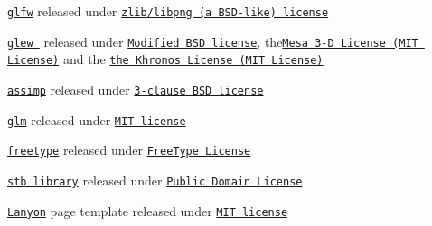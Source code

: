 \begin{DoxyItemize}
\item \href{http://www.glfw.org}{\tt glfw} released under \href{v}{\tt zlib/libpng (a B\+S\+D-\/like) license} 
\item \href{https://github.com/omniavinco/glew-cmake}{\tt glew } released under \href{http://glew.sourceforge.net/glew.txt}{\tt Modified B\+S\+D license}, the\href{http://glew.sourceforge.net/mesa.txt}{\tt Mesa 3-\/\+D License (M\+I\+T License)} and the \href{http://glew.sourceforge.net/khronos.txt}{\tt the Khronos License (M\+I\+T License)} 
\item \href{http://assimp.sourceforge.net/}{\tt assimp} released under \href{http://assimp.sourceforge.net/main_license.html}{\tt 3-\/clause B\+S\+D license} 
\item \href{http://glm.g-truc.net}{\tt glm} released under \href{http://glm.g-truc.net/copying.txt}{\tt M\+I\+T license}  
\item \href{http://www.freetype.org}{\tt freetype} released under \href{http://git.savannah.gnu.org/cgit/freetype/freetype2.git/tree/docs/FTL.TXT}{\tt Free\+Type License} 
\item \href{https://github.com/nothings/stb}{\tt stb library} released under \href{https://github.com/nothings/stb/blob/master/README.md#whats-the-license}{\tt Public Domain License} 
\item \href{https://github.com/poole/lanyon}{\tt Lanyon} page template released under \href{https://github.com/poole/lanyon/blob/master/LICENSE.md}{\tt M\+I\+T license} 
\end{DoxyItemize}